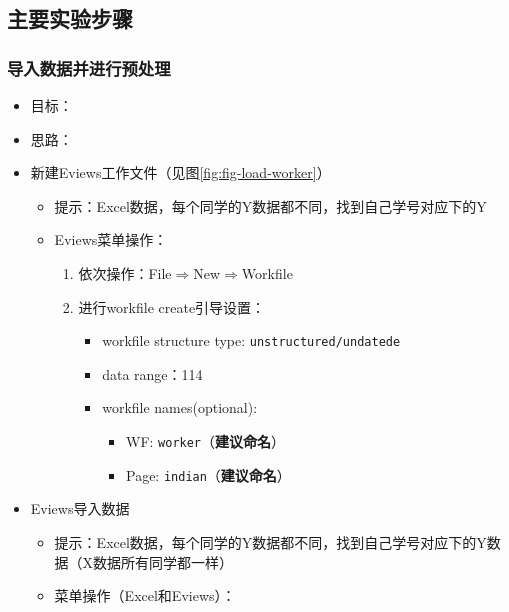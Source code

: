 \documentclass[12pt,(landscape,a4paper),(portrait,a4paper)]{article}
\providecommand{\tightlist}{%
  \setlength{\itemsep}{0pt}\setlength{\parskip}{0pt}}
\theoremstyle{definition}
\theoremstyle{definition}
\theoremstyle{definition}
\theoremstyle{remark}
\begin{document}
\subsection{主要实验步骤}

\subsubsection{导入数据并进行预处理}

\begin{itemize}
\tightlist
\item
  目标：
\item
  思路：
\item
  新建Eviews工作文件（见图\ref{fig:fig-load-worker}）

  \begin{itemize}
  \tightlist
  \item
    提示：Excel数据，每个同学的Y数据都不同，找到自己学号对应下的Y
  \item
    Eviews菜单操作：

    \begin{enumerate}
    \def\labelenumi{\alph{enumi}.}
    \tightlist
    \item
      依次操作：File\(\Rightarrow\)New\(\Rightarrow\)Workfile
    \item
      进行workfile create引导设置：

      \begin{itemize}
      \tightlist
      \item
        workfile structure type: \texttt{unstructured/undatede}
      \item
        data range：114
      \item
        workfile names(optional):

        \begin{itemize}
        \tightlist
        \item
          WF: \texttt{worker}（\textbf{建议命名}）
        \item
          Page: \texttt{indian}（\textbf{建议命名}）
        \end{itemize}
      \end{itemize}
    \end{enumerate}
  \end{itemize}
\item
  Eviews导入数据

  \begin{itemize}
  \tightlist
  \item
    提示：Excel数据，每个同学的Y数据都不同，找到自己学号对应下的Y数据（X数据所有同学都一样）\\
  \item
    菜单操作（Excel和Eviews）：


\end{itemize}
\end{itemize}
\end{document}
